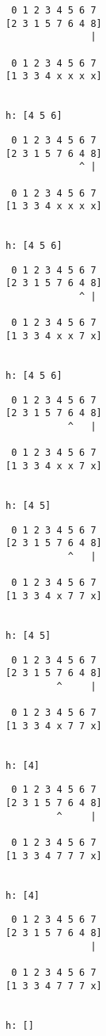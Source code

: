 { \begin{verbatim}
 0 1 2 3 4 5 6 7
[2 3 1 5 7 6 4 8]
               |

 0 1 2 3 4 5 6 7
[1 3 3 4 x x x x]


h: [4 5 6]
\end{verbatim} }

{ \begin{verbatim}
 0 1 2 3 4 5 6 7
[2 3 1 5 7 6 4 8]
             ^ |

 0 1 2 3 4 5 6 7
[1 3 3 4 x x x x]


h: [4 5 6]
\end{verbatim} }

{ \begin{verbatim}
 0 1 2 3 4 5 6 7
[2 3 1 5 7 6 4 8]
             ^ |

 0 1 2 3 4 5 6 7
[1 3 3 4 x x 7 x]


h: [4 5 6]
\end{verbatim} }

{ \begin{verbatim}
 0 1 2 3 4 5 6 7
[2 3 1 5 7 6 4 8]
           ^   |

 0 1 2 3 4 5 6 7
[1 3 3 4 x x 7 x]


h: [4 5]
\end{verbatim} }

{ \begin{verbatim}
 0 1 2 3 4 5 6 7
[2 3 1 5 7 6 4 8]
           ^   |

 0 1 2 3 4 5 6 7
[1 3 3 4 x 7 7 x]


h: [4 5]
\end{verbatim} }

{ \begin{verbatim}
 0 1 2 3 4 5 6 7
[2 3 1 5 7 6 4 8]
         ^     |

 0 1 2 3 4 5 6 7
[1 3 3 4 x 7 7 x]


h: [4]
\end{verbatim} }

{ \begin{verbatim}
 0 1 2 3 4 5 6 7
[2 3 1 5 7 6 4 8]
         ^     |

 0 1 2 3 4 5 6 7
[1 3 3 4 7 7 7 x]


h: [4]
\end{verbatim} }

{ \begin{verbatim}
 0 1 2 3 4 5 6 7
[2 3 1 5 7 6 4 8]
               |

 0 1 2 3 4 5 6 7
[1 3 3 4 7 7 7 x]


h: []
\end{verbatim} }

